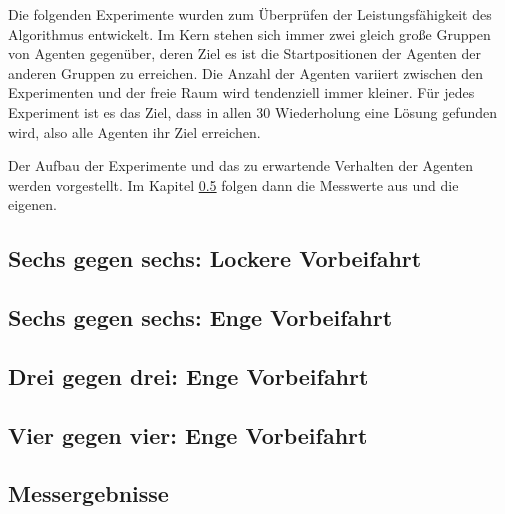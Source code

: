 Die folgenden Experimente wurden zum Überprüfen der Leistungsfähigkeit des Algorithmus entwickelt. Im Kern stehen sich immer zwei gleich große Gruppen von Agenten gegenüber, deren Ziel es ist die Startpositionen der Agenten der anderen Gruppen zu erreichen. Die Anzahl der Agenten variiert zwischen den Experimenten und der freie Raum wird tendenziell immer kleiner. Für jedes Experiment ist es das Ziel, dass in allen 30 Wiederholung eine Lösung gefunden wird, also alle Agenten ihr Ziel erreichen.

Der Aufbau der Experimente und das zu erwartende Verhalten der Agenten werden vorgestellt. Im Kapitel \ref{chap:ergebnisse} folgen dann die Messwerte aus \cite{book:regele} und die eigenen.

\subsection{Sechs gegen sechs: Lockere Vorbeifahrt}
\label{chap:6x6_locker}

\subsection{Sechs gegen sechs: Enge Vorbeifahrt}
\label{chap:6x6_eng}

\subsection{Drei gegen drei: Enge Vorbeifahrt}
\label{chap:3x3_eng}

\subsection{Vier gegen vier: Enge Vorbeifahrt}
\label{chap:4x4_eng}

\subsection{Messergebnisse}
\label{chap:ergebnisse}
